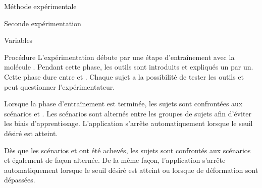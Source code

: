 \documentclass[myfrancais]{mythesis}
\begin{document}
\begin{mychapter}{Méthode expérimentale}
\begin{mysection}{Seconde expérimentation}
\begin{mysubsection}{Variables}
			\end{mysubsection}
			\begin{mysubsection}{Procédure}
				L'expérimentation débute par une étape d'entraînement avec la molécule \myPrion.
				Pendant cette phase, les outils sont introduits et expliqués un par un.
				Cette phase dure entre  et .
				Chaque sujet a la possibilité de tester les outils et peut questionner l'expérimentateur.

				Lorsque la phase d'entraînement est terminée, les sujets sont confrontées aux scénarios  et .
				Les scénarios sont alternés entre les groupes de sujets afin d'éviter les biais d'apprentissage.
				L'application s'arrête automatiquement lorsque le seuil  désiré est atteint.

				Dès que les scénarios  et  ont été achevés, les sujets sont confrontés aux scénarios  et  également de façon alternée.
				De la même façon, l'application s'arrête automatiquement lorsque le seuil  désiré est atteint ou lorsque  de déformation sont dépassées.


\end{mysubsection}
\end{mysection}
\end{mychapter}
\end{document}
